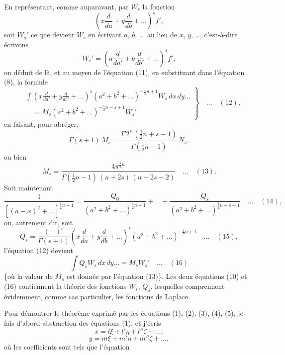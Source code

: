 \documentclass[11pt]{article}
\begin{document}

En repr\'esentant, comme auparavant, par $W_{s}$ la fonction
\[
\left(x\frac{d}{da} + y\frac{d}{db} + \ldots\right)^{\!s}\!\!f',
\]
soit $W_{s}'$ ce que devient $W_{s}$ en \'ecrivant $a$, $b$, \ldots\ au lieu de $x$, $y$, \ldots, c'est-\`a-dire \'ecrivons
\[
W_{s}' = \!\left(a\frac{d}{da'} + b\frac{d}{db'} + \ldots\right)^{\!s}\!\!f',
\]
on d\'eduit de l\`a, et au moyen de l'\'equation (11), en substituant dans l'\'equation (8), la
formule
\[
\left.\begin{aligned}
&\int\!\left(x\frac{d}{da'} + y\frac{d}{db'} + \ldots\right)^{\!s}\!\!(a^{2} + b^{2} + \ldots)^{-\tfrac{1}{2}n + 1}W_{s}\,dx\,dy\ldots\\
&\quad = M_{s}(a^{2} + b^{2} + \ldots)^{-\tfrac{1}{2}n - s + 1}W_{s}'
\end{aligned}\right\}\quad\ldots\quad (12),
\]
en faisant, pour abr\'eger,
\[
\Gamma(s + 1)\,M_{s} = \frac{\Gamma\,2^{s}\,(\tfrac{1}{2}n + s - 1)}{\Gamma(\tfrac{1}{2}n - 1)}\,N_{s},
\]
ou bien
\[
M_{s} = \frac{4\pi^{\tfrac{1}{2}n}}{\Gamma(\tfrac{1}{2}n - 1)\,(n + 2s)\,(n + 2s - 2)}\quad\ldots\quad (13).
\]
Soit maintenant
\[
\frac{1}{[(a - x)^{2} + \ldots]^{\tfrac{1}{2}n - 1}} = \frac{Q_{0}}{(a^{2} + b^{2} + \ldots)^{\tfrac{1}{2}n - 1}} + \ldots + \frac{Q_{s}}{(a^{2} + b^{2} + \ldots)^{\tfrac{1}{2}n + s - 1}}\quad\ldots\quad (14),
\]
ou, autrement dit, soit
\[
Q_{s} = \frac{(-)^{s}}{\Gamma(s + 1)}\!\left(x\frac{d}{da} + y\frac{d}{db} + \ldots\right)^{\!s}\!\!(a^{2} + b^{2} + \ldots)^{-\tfrac{1}{2}n + 1}\quad\ldots\quad (15),
\]
l'\'equation (12) devient
\[
\int Q_{s}W_{s}\,dx\,dy\ldots = M_{s}W_{s}'\quad\ldots\quad (16)
\]
\{o\`u la valeur de $M_{s}$ est donn\'ee par l'\'equation (13)\}. Les deux \'equations (10) et (16)
contiennent la th\'eorie des fonctions $W_{s}$, $Q_{s}$, lesquelles comprennent \'evidemment, comme
cas particulier, les fonctions de Laplace.

\medskip
Pour d\'emontrer le th\'eor\`eme exprim\'e par les \'equations (1), (2), (3), (4), (5), je fais
d'abord abstraction des \'equations (1), et j'\'ecris
\[
x = l\xi + l'\eta + l''\zeta + \ldots,
\]
\[
y = m\xi + m'\eta + m''\zeta + \ldots,
\]
o\`u les coefficients sont tels que l'\'equation
\end{document}
